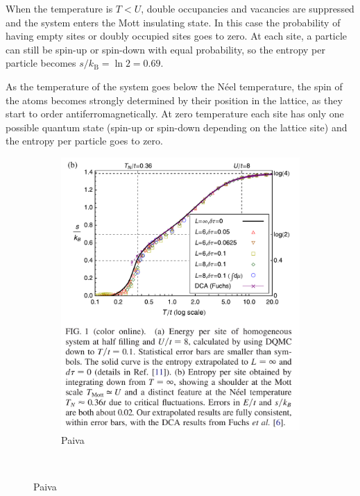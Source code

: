 \documentclass[11pt,letter]{article}
\newcommand{\kb}{\ensuremath{k_{\text{B}}}}
\begin{document}
When the temperature is $T<U$, double occupancies and vacancies are suppressed
and the system enters the Mott insulating state.  In this case the probability
of having empty sites or doubly occupied sites goes to zero.   At each site, a
particle can still  be spin-up or spin-down with equal probability, so the
entropy per particle becomes $s/\kb = \ln 2 = 0.69 $.   

As the temperature of the system goes below the N\'{e}el temperature, the spin
of the atoms becomes strongly determined by their position in the lattice,  as
they start to order antiferromagnetically.  At zero temperature each site has
only one possible quantum state (spin-up or spin-down depending on the lattice
site) and the entropy per particle goes to zero.   

\begin{figure}
        \centering
        \begin{subfigure}[b]{0.48\textwidth}
                \includegraphics[width=\textwidth]{figures/paiva_entropy.png}
                \caption{Paiva~\cite{Paiva2011}}
                \label{fig:paiva-entropy3D}
        \end{subfigure}
        ~ %

\end{figure}
\end{document}
